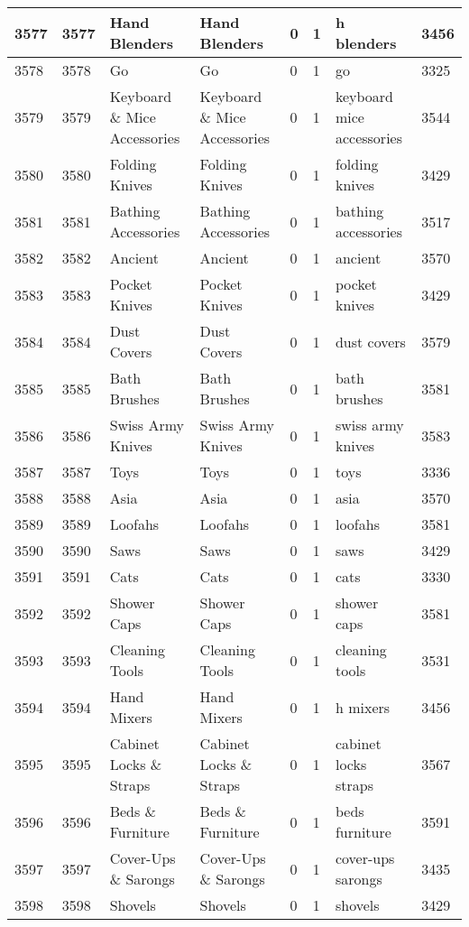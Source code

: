 \begin{longtable}{|l|l|l|l|l|l|l|l|}
3577 & 3577 & Hand Blenders & Hand Blenders & 0 & 1 & h blenders & 3456 \\ \hline 
3578 & 3578 & Go & Go & 0 & 1 & go & 3325 \\ \hline 
3579 & 3579 & Keyboard \& Mice Accessories & Keyboard \& Mice Accessories & 0 & 1 & keyboard mice accessories & 3544 \\ \hline 
3580 & 3580 & Folding Knives & Folding Knives & 0 & 1 & folding knives & 3429 \\ \hline 
3581 & 3581 & Bathing Accessories & Bathing Accessories & 0 & 1 & bathing accessories & 3517 \\ \hline 
3582 & 3582 & Ancient & Ancient & 0 & 1 & ancient & 3570 \\ \hline 
3583 & 3583 & Pocket Knives & Pocket Knives & 0 & 1 & pocket knives & 3429 \\ \hline 
3584 & 3584 & Dust Covers & Dust Covers & 0 & 1 & dust covers & 3579 \\ \hline 
3585 & 3585 & Bath Brushes & Bath Brushes & 0 & 1 & bath brushes & 3581 \\ \hline 
3586 & 3586 & Swiss Army Knives & Swiss Army Knives & 0 & 1 & swiss army knives & 3583 \\ \hline 
3587 & 3587 & Toys & Toys & 0 & 1 & toys & 3336 \\ \hline 
3588 & 3588 & Asia & Asia & 0 & 1 & asia & 3570 \\ \hline 
3589 & 3589 & Loofahs & Loofahs & 0 & 1 & loofahs & 3581 \\ \hline 
3590 & 3590 & Saws & Saws & 0 & 1 & saws & 3429 \\ \hline 
3591 & 3591 & Cats & Cats & 0 & 1 & cats & 3330 \\ \hline 
3592 & 3592 & Shower Caps & Shower Caps & 0 & 1 & shower caps & 3581 \\ \hline 
3593 & 3593 & Cleaning Tools & Cleaning Tools & 0 & 1 & cleaning tools & 3531 \\ \hline 
3594 & 3594 & Hand Mixers & Hand Mixers & 0 & 1 & h mixers & 3456 \\ \hline 
3595 & 3595 & Cabinet Locks \& Straps & Cabinet Locks \& Straps & 0 & 1 & cabinet locks straps & 3567 \\ \hline 
3596 & 3596 & Beds \& Furniture & Beds \& Furniture & 0 & 1 & beds furniture & 3591 \\ \hline 
3597 & 3597 & Cover-Ups \& Sarongs & Cover-Ups \& Sarongs & 0 & 1 & cover-ups sarongs & 3435 \\ \hline 
3598 & 3598 & Shovels & Shovels & 0 & 1 & shovels & 3429 \\ \hline 

\end{longtable}
